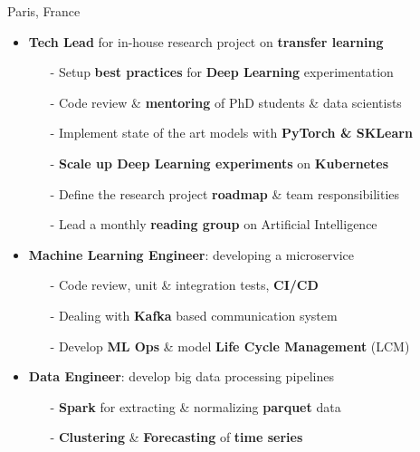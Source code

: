 \documentclass[10pt,a4paper,ragged2e]{altacv}
\begin{document}
     {Paris, France}
\begin{itemize}
    \item \textbf{Tech Lead} for in-house research project on \textbf{transfer learning}
    \vspace{0.3em}
    \begin{itemize}
    	\item[-] Setup \textbf{best practices} for \textbf{Deep Learning} experimentation
        \item[-] Code review \& \textbf{mentoring} of PhD students \& data scientists
        \item[-] Implement state of the art models with \textbf{PyTorch \& SKLearn}
        \item[-] \textbf{Scale up Deep Learning experiments} on \textbf{Kubernetes}
        \item[-] Define the research project \textbf{roadmap} \& team responsibilities
        \item[-] Lead a monthly \textbf{reading group} on Artificial Intelligence
    \end{itemize}
    \item \textbf{Machine Learning Engineer}: developing a microservice
    \vspace{0.3em}
    \begin{itemize}
        \item[-] Code review, unit \& integration tests, \textbf{CI/CD}
        \item[-] Dealing with \textbf{Kafka} based communication system 
        \item[-] Develop \textbf{ML Ops} \& model \textbf{Life Cycle Management} (LCM) 
    \end{itemize}
	
	\item \textbf{Data Engineer}: develop big data processing pipelines 
	\vspace{0.3em}
	\begin{itemize}
		\item[-] \textbf{Spark} for extracting \& normalizing \textbf{parquet} data
		\item[-] \textbf{Clustering} \& \textbf{Forecasting} of \textbf{time series} 
	\end{itemize}
	
\end{itemize}
\end{document}
